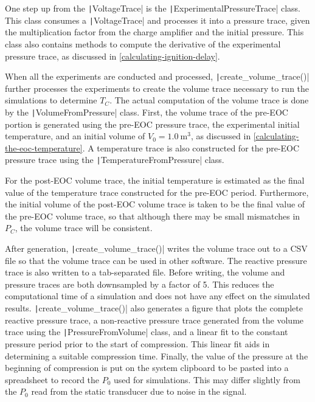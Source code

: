 \documentclass[12pt]{../ussci}
\begin{document}
One step up from the \texttt|VoltageTrace| is the
\texttt|ExperimentalPressureTrace| class. This class consumes a
\texttt|VoltageTrace| and processes it into a pressure trace, given the
multiplication factor from the charge amplifier and the initial
pressure. This class also contains methods to compute the derivative of
the experimental pressure trace, as discussed in
\cref{calculating-ignition-delay}.

When all the experiments are conducted and processed,
\texttt|create_volume_trace()| further processes the experiments to
create the volume trace necessary to run the simulations to determine
\(T_C\). The actual computation of the volume trace is done by the
\texttt|VolumeFromPressure| class. First, the volume trace of the
pre-EOC portion is generated using the pre-EOC pressure trace, the
experimental initial temperature, and an initial volume of
\(V_0=\SI{1.0}{\m\cubed}\), as discussed in
\cref{calculating-the-eoc-temperature}.
A temperature trace is also constructed for the pre-EOC pressure trace
using the \texttt|TemperatureFromPressure| class.

For the post-EOC volume trace, the initial temperature is estimated as
the final value of the temperature trace constructed for the pre-EOC
period. Furthermore, the initial volume of the post-EOC volume trace is
taken to be the final value of the pre-EOC volume trace, so that
although there may be small mismatches in \(P_C\), the volume trace will
be consistent.

After generation, \texttt|create_volume_trace()| writes the volume
trace out to a CSV file so that the volume trace can be used in other
software. The reactive pressure trace is also written to a tab-separated
file. Before writing, the volume and pressure traces are both
downsampled by a factor of 5. This reduces the computational time of a
simulation and does not have any effect on the simulated results.
\texttt|create_volume_trace()| also generates a figure that plots the
complete reactive pressure trace, a non-reactive pressure trace
generated from the volume trace using the \texttt|PressureFromVolume|
class, and a linear fit to the constant pressure period prior to the
start of compression. This linear fit aids in determining a suitable
compression time. Finally, the value of the pressure at the beginning of
compression is put on the system clipboard to be pasted into a
spreadsheet to record the \(P_0\) used for simulations. This may differ
slightly from the \(P_0\) read from the static transducer due to noise
in the signal.
\end{document}
